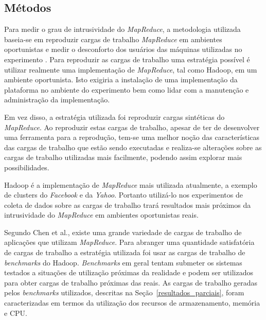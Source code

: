 \documentclass[a4paper,10pt]{article}
\begin{document}
\subsection{Métodos}
\label{metodos}

Para medir o grau de intrusividade do \textit{MapReduce}, a metodologia
utilizada baseia-se em reproduzir cargas de trabalho \textit{MapReduce} em
ambientes oportunistas e medir o desconforto dos usuários das máquinas
utilizadas no experimento\cite{Gupta:2004:MUU:1032647.1033307}
\cite{Dinda:2007:UEC:1287050.1287061}.
Para reproduzir as cargas de trabalho uma estratégia possível é utilizar
realmente uma implementação de \textit{MapReduce}, tal como Hadoop, em um
ambiente oportunista. Isto exigiria a instalação de uma implementação da
plataforma no ambiente do experimento bem como lidar com a manutenção e
administração da implementação.

Em vez disso, a estratégia utilizada foi reproduzir cargas sintéticas do
\textit{MapReduce}. Ao reproduzir estas cargas de trabalho, apesar
de ter de desenvolver uma ferramenta para a reprodução, tem-se uma melhor noção
das características das cargas de trabalho que estão sendo executadas e
realiza-se alterações sobre as cargas de trabalho utilizadas mais facilmente,
podendo assim explorar mais possibilidades.

Hadoop é a implementação de \textit{MapReduce} mais utilizada atualmente, a
exemplo de clusters do
\textit{Facebook}\cite{Borthakur:2011:AHG:1989323.1989438} e da
\textit{Yahoo}\cite{Olston:2011:NCP:1989323.1989439}. Portanto utilizá-lo nos
experimentos de coleta de dados sobre as cargas de trabalho trará resultados
mais próximos da intrusividade do \textit{MapReduce} em ambientes oportunistas reais.

Segundo Chen et al.\cite{Chen:2012:IAP:2367502.2367519}, existe uma
grande variedade de cargas de trabalho de aplicações que
utilizam \textit{MapReduce}. Para abranger uma quantidade satisfatória de cargas
de trabalho a estratégia utilizada foi usar as cargas de trabalho de
\textit{benchmarks} do Hadoop. \textit{Benchmarks} em geral tentam submeter
os sistemas testados a situações de utilização próximas da realidade e podem ser
utilizados para obter cargas de trabalho próximas das reais. 
As cargas de trabalho geradas pelos \textit{benchmarks} utilizados, descritas na
Seção~\ref{resultados_parciais}, foram caracterizadas em termos da utilização
dos
recursos de armazenamento, memória e CPU.
\end{document}
